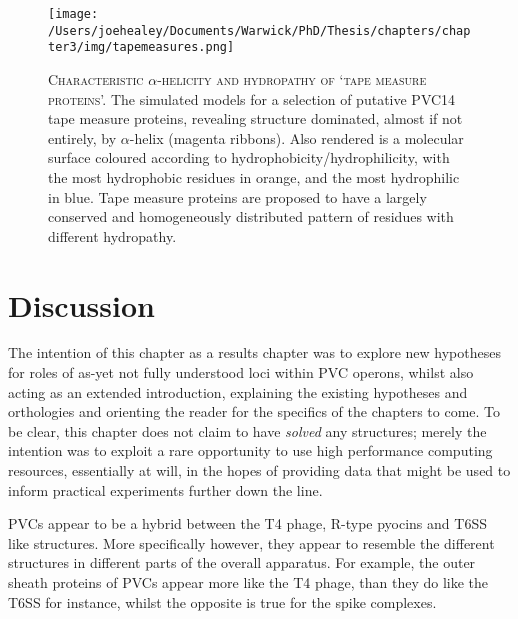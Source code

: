 \begin{figure}[h!]
 \thispagestyle{IHA-fancy-style}
 \centering
   \texttt{[image: /Users/joehealey/Documents/Warwick/PhD/Thesis/chapters/chapter3/img/tapemeasures.png]}
 \captionsetup{singlelinecheck=off, justification=justified, font=footnotesize, aboveskip=10pt}
 \caption[Conservation mapping off putative tail fibre structures]{\textsc{\normalsize Characteristic $\alpha$-helicity and hydropathy of `tape measure proteins'.}\vspace{0.1cm} \newline The simulated models for a selection of putative PVC14 tape measure proteins, revealing structure dominated, almost if not entirely, by $\alpha$-helix (magenta ribbons). Also rendered is a molecular surface coloured according to hydrophobicity/hydrophilicity, with the most hydrophobic residues in orange, and the most hydrophilic in blue. Tape measure proteins are proposed to have a largely conserved and homogeneously distributed pattern of residues with different hydropathy. }
 \label{tapemeasures}
\end{figure}




\clearpage
\section{Discussion}
The intention of this chapter as a results chapter was to explore new hypotheses for roles of as-yet not fully understood loci within PVC operons, whilst also acting as an extended introduction, explaining the existing hypotheses and orthologies and orienting the reader for the specifics of the chapters to come. To be clear, this chapter does not claim to have \emph{solved} any structures; merely the intention was to exploit a rare opportunity to use high performance computing resources, essentially at will, in the hopes of providing data that might be used to inform practical experiments further down the line.

PVCs appear to be a hybrid between the T4 phage, R-type pyocins and T6SS like structures. More specifically however, they appear to resemble the different structures in different parts of the overall apparatus. For example, the outer sheath proteins of PVCs appear more like the T4 phage, than they do like the T6SS for instance, whilst the opposite is true for the spike complexes.

